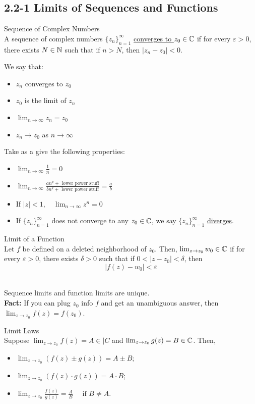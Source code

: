\documentclass[10pt]{paper}
\newcommand{\gspc}{\vspace{0.13cm}} %
\newcommand{\gline}[0]{\gspc\\} %
\newcommand{\ul}[1]{\underline{#1}}
\begin{document}
\subsection*{2.2-1 Limits of Sequences and Functions}
\begin{definition}{Sequence of Complex Numbers}{}\gline{}
  A sequence of complex numbers $\{z_n\}^\infty_{n=1}$ \ul{converges to $z_0\in\mathbb{C}$} if for every $\varepsilon>0$, there exists $N\in\mathbb{N}$ such that if $n>N$, then $|z_n-z_0|<0$. 
\end{definition}
We say that:
\begin{itemize}
  \item $z_n$ converges to $z_0$
  \item $z_0$ is the limit of $z_n$
  \item $\lim_{n\to\infty}z_n = z_0$
  \item $z_n\to z_0$ as $n\to\infty$
\end{itemize}
Take as a give the following properties:
\begin{itemize}
  \item $\lim_{n\to\infty}\frac{1}n = 0$
  \item $\displaystyle \lim_{n\to\infty}\frac{an^k + \text{ lower power stuff}}{bn^k + \text{ lower power stuff}} = \frac{a}b$
  \item If $|z|<1,\quad \lim_{n\to\infty}z^n = 0$
  \item If $\{z_n\}_{n=1}^\infty$ does not converge to any $z_0\in\mathbb{C}$, we say $\{z_n\}^\infty_{n=1}$ \ul{diverges}.
\end{itemize}
\begin{definition}{Limit of a Function}{}\gline{}
  Let $f$ be defined on a deleted neighborhood of $z_0$. Then, $\lim_{z\to z_0}w_0\in\mathbb{C}$ if for every $\varepsilon > 0$, there exists $\delta >0$ such that if $ 0 < |z- z_0|<\delta$, then 
  \[|f(z) - w_0|<\varepsilon\]
\end{definition}
\begin{theorem}{}{}\gline{}
  Sequence limits and function limits are unique.\gline{}
  \textbf{Fact: }If you can plug $z_0$ info $f$ and get an unambiguous answer, then $\lim_{z\to z_0}f(z)=f(z_0)$. 
  \begin{corollary}{Limit Laws}{}\gline{}
    Suppose $\lim_{z\to z_0}f(z) = A\in |C$ and $\lim_{z\to z_0}g(z) = B\in\mathbb{C}$. Then, 
    \begin{itemize}
      \item $\lim_{z\to z_0}(f(z)\pm g(z)) = A\pm B$;
      \item $\lim_{z\to z_0}(f(z)\cdot g(z))=A\cdot B$;
      \item $\displaystyle\lim_{z\to z_0}\frac{f(z)}{g(z)}=\frac{A}B\quad \text{ if } B\ne A$. 
    \end{itemize}
  \end{corollary}
\end{theorem}
\end{document}
